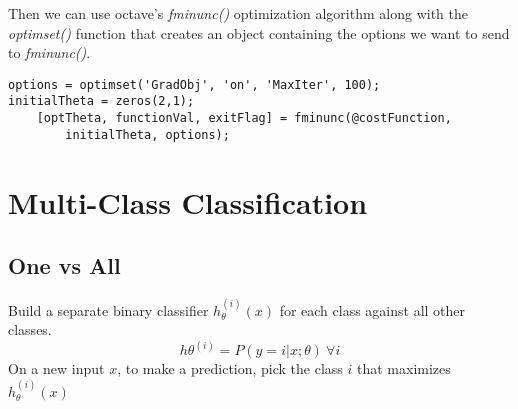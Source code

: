 Then we can use octave's \emph{fminunc()} optimization algorithm along with the
\emph{optimset()} function that creates an object containing the options we
want to send to \emph{fminunc()}.
\begin{verbatim}
options = optimset('GradObj', 'on', 'MaxIter', 100);
initialTheta = zeros(2,1);
	[optTheta, functionVal, exitFlag] = fminunc(@costFunction, 
		initialTheta, options);
\end{verbatim}

\section{Multi-Class Classification}
\subsection{One vs All}
Build a separate binary classifier $h_\theta^{(i)}(x)$ for each class against all
other classes.
\begin{equation*}
    h\theta^{(i)} = P(y = i | x; \theta)\ \forall i
\end{equation*}
On a new input $x$, to make a prediction, pick the class $i$ that maximizes
$h_\theta^{(i)}(x)$

